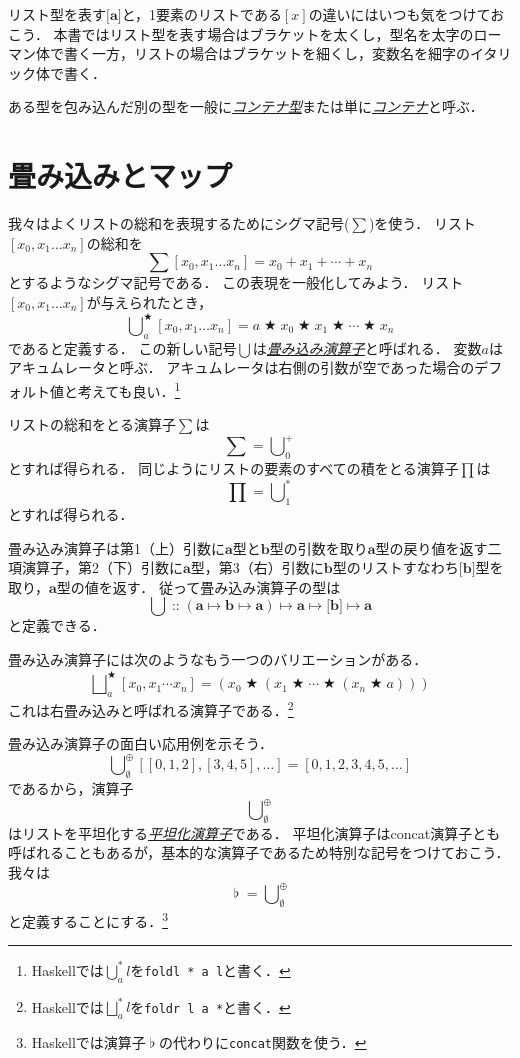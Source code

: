 \documentclass[twocolumn]{jsbook}
\newcommand{\keyword}[1]{\underline{\emph{#1}}}
\newcommand{\code}[1]{\texttt{#1}}
\newcommand{\hsklType}[1]{\textbf{#1}}
\DeclareMathOperator{\hsklConcat}{\flat}
\newcommand{\hsklAppend}{\oplus}
\newcommand{\hsklEmptyList}{\emptyset}
\newcommand{\hsklListType}[1]{\boldsymbol{[}#1\boldsymbol{]}}
\DeclareMathOperator{\mathAnyBinaryOperator}{\bigstar}
\DeclareMathOperator{\mathIn}{::}
\DeclareMathOperator*{\mathFold}{\bigcup}
\DeclareMathOperator*{\mathFoldRight}{\bigsqcup}
\DeclareMathOperator{\mathMapsTo}{\mapsto}
\newcommand{\mathMorphII}[3]{#1\mathMapsTo#2\mathMapsTo#3}
\newcommand{\mathMorphIII}[4]{#1\mathMapsTo#2\mathMapsTo#3\mathMapsTo#4}
\begin{document}
リスト型を表す$\hsklListType{\hsklType{a}}$と，1要素のリストである$[x]$の違いにはいつも気をつけておこう．
本書ではリスト型を表す場合はブラケットを太くし，型名を太字のローマン体で書く一方，リストの場合はブラケットを細くし，変数名を細字のイタリック体で書く．

ある型を包み込んだ別の型を一般に\keyword{コンテナ型}または単に\keyword{コンテナ}と呼ぶ．

\section{畳み込みとマップ}

我々はよくリストの総和を表現するためにシグマ記号($\sum$)を使う．
リスト$[x_0,x_1\dots x_n]$の総和を$$\sum[x_0,x_1\dots x_n]=x_0+x_1+\dotsb+x_n$$とするようなシグマ記号である．
この表現を一般化してみよう．
リスト$[x_0,x_1\dots x_n]$が与えられたとき，$$\mathFold^{\mathAnyBinaryOperator}_{a}[x_0,x_1\dots x_n]=a\mathAnyBinaryOperator x_0\mathAnyBinaryOperator x_1\mathAnyBinaryOperator\dotsb\mathAnyBinaryOperator x_n$$であると定義する．
この新しい記号$\mathFold$は\keyword{畳み込み演算子}と呼ばれる．
変数$a$はアキュムレータと呼ぶ．
アキュムレータは右側の引数が空であった場合のデフォルト値と考えても良い．\footnote{Haskellでは$\mathFold^{*}_{a}l$を\code{foldl * a l}と書く．}

リストの総和をとる演算子$\sum$は$$\sum=\mathFold^+_0$$とすれば得られる．
同じようにリストの要素のすべての積をとる演算子$\prod$は$$\prod=\mathFold^*_1$$とすれば得られる．

畳み込み演算子は第1（上）引数に$\hsklType{a}$型と$\hsklType{b}$型の引数を取り$\hsklType{a}$型の戻り値を返す二項演算子，第2（下）引数に$\hsklType{a}$型，第3（右）引数に$\hsklType{b}$型のリストすなわち$\hsklListType{\hsklType{b}}$型を取り，$\hsklType{a}$型の値を返す．
従って畳み込み演算子の型は$$\mathFold\mathIn\mathMorphIII{(\mathMorphII{\hsklType{a}}{\hsklType{b}}{\hsklType{a}})}{\hsklType{a}}{\hsklListType{\hsklType{b}}}{\hsklType{a}}$$と定義できる．

畳み込み演算子には次のようなもう一つのバリエーションがある．
$$\mathFoldRight^{\mathAnyBinaryOperator}_{a}[x_0,x_1\dotsb x_n]=\left(x_0\mathAnyBinaryOperator\left(x_1\mathAnyBinaryOperator\dotsb\mathAnyBinaryOperator\left(x_n\mathAnyBinaryOperator a\right)\right)\right)$$
これは右畳み込みと呼ばれる演算子である．\footnote{Haskellでは$\mathFoldRight^{*}_{a}l$を\code{foldr l a *}と書く．}

畳み込み演算子の面白い応用例を示そう．
$$\mathFold_\hsklEmptyList^\hsklAppend[[0,1,2],[3,4,5],\dots]=[0,1,2,3,4,5,\dots]$$
であるから，演算子$$\mathFold_\hsklEmptyList^\hsklAppend$$はリストを平坦化する\keyword{平坦化演算子}である．
平坦化演算子はconcat演算子とも呼ばれることもあるが，基本的な演算子であるため特別な記号をつけておこう．
我々は$$\hsklConcat=\mathFold_\hsklEmptyList^\hsklAppend$$と定義することにする．\footnote{Haskellでは演算子$\hsklConcat$の代わりに\code{concat}関数を使う．}
\end{document}
